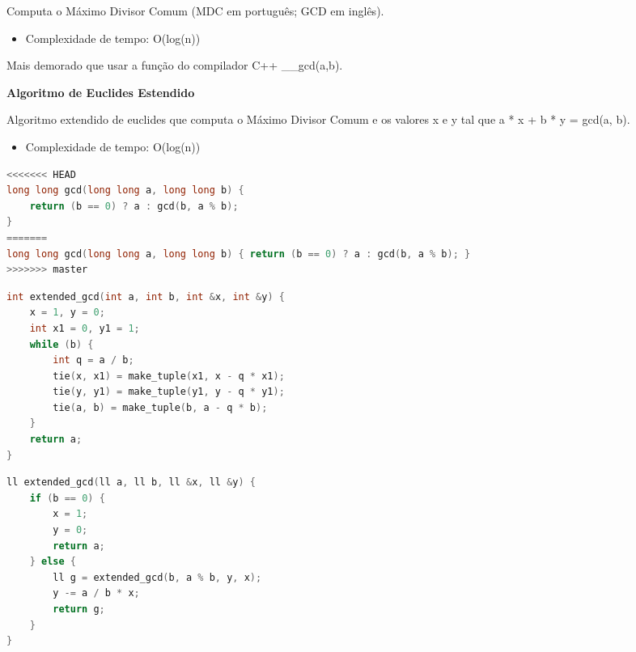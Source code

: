 \documentclass[11pt, a4paper, oneside]{book}
\begin{document}
Computa o Máximo Divisor Comum (MDC em português; GCD em inglês).



\begin{itemize}
\item Complexidade de tempo: O(log(n))
\end{itemize}



Mais demorado que usar a função do compilador C++ \_\_gcd(a,b).



\textbf{Algoritmo de Euclides Estendido} 



Algoritmo extendido de euclides que computa o Máximo Divisor Comum e os valores x e y tal que a * x + b * y = gcd(a, b).



\begin{itemize}
\item Complexidade de tempo: O(log(n))
\end{itemize}

\hfill

\begin{multicols}{2}
\begin{lstlisting}[language=C++]
<<<<<<< HEAD
long long gcd(long long a, long long b) {
    return (b == 0) ? a : gcd(b, a % b);
}
=======
long long gcd(long long a, long long b) { return (b == 0) ? a : gcd(b, a % b); }
>>>>>>> master
\end{lstlisting}
\end{multicols}

\hfill

\begin{multicols}{2}
\begin{lstlisting}[language=C++]
int extended_gcd(int a, int b, int &x, int &y) {
    x = 1, y = 0;
    int x1 = 0, y1 = 1;
    while (b) {
        int q = a / b;
        tie(x, x1) = make_tuple(x1, x - q * x1);
        tie(y, y1) = make_tuple(y1, y - q * y1);
        tie(a, b) = make_tuple(b, a - q * b);
    }
    return a;
}
\end{lstlisting}
\end{multicols}

\hfill

\begin{multicols}{2}
\begin{lstlisting}[language=C++]
ll extended_gcd(ll a, ll b, ll &x, ll &y) {
    if (b == 0) {
        x = 1;
        y = 0;
        return a;
    } else {
        ll g = extended_gcd(b, a % b, y, x);
        y -= a / b * x;
        return g;
    }
}
\end{lstlisting}
\end{multicols}
\end{document}
